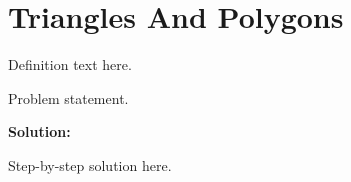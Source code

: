 \section{Triangles And Polygons}


\begin{definition}[Term]
Definition text here.
\end{definition}

\begin{example}
Problem statement.

\textbf{Solution:}

Step-by-step solution here.
\end{example}
